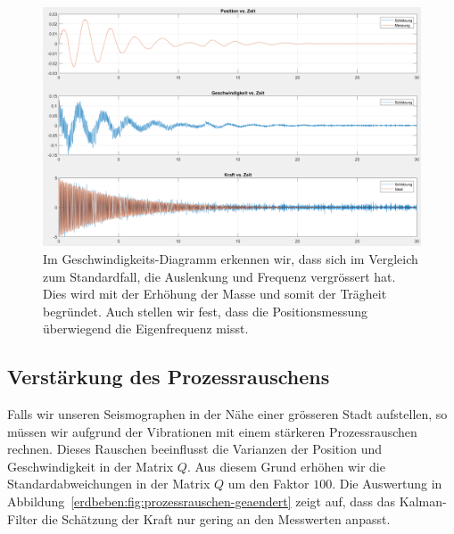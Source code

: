 \begin{figure}
	\begin{center}
		\includegraphics[width=\linewidth,keepaspectratio]{papers/erdbeben/Systemparameter_geaendert_2.PNG}
		\caption{Im Geschwindigkeits-Diagramm erkennen wir, dass sich im Vergleich zum Standardfall, die Auslenkung und Frequenz vergrössert hat. Dies wird mit der Erhöhung der Masse und somit der Trägheit begründet. Auch stellen wir fest, dass die Positionsmessung überwiegend die Eigenfrequenz misst.}
    \label{erdbeben:fig:systemparameter-geaendert}
	\end{center}
\end{figure}


\subsection{Verstärkung des Prozessrauschens}
Falls wir unseren Seismographen in der Nähe einer grösseren Stadt aufstellen, so müssen wir aufgrund der Vibrationen mit einem stärkeren Prozessrauschen rechnen.
Dieses Rauschen beeinflusst die Varianzen der Position und Geschwindigkeit in der Matrix $Q$.
Aus diesem Grund erhöhen wir die Standardabweichungen in der Matrix $Q$ um den Faktor $100$.
Die Auswertung in Abbildung~\ref{erdbeben:fig:prozessrauschen-geaendert} zeigt auf, dass das Kalman-Filter die Schätzung der Kraft nur gering an den Messwerten anpasst.

